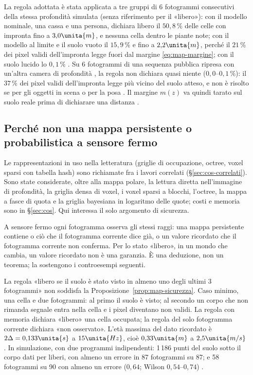 La regola adottata è stata applicata a tre gruppi di 6 fotogrammi consecutivi della stessa profondità simulata (senza riferimento per il «libero»): con il modello nominale, una cassa e una persona, dichiara libero il $50{,}8\,\%$ delle celle con impronta fino a $3{,}0\unita{m}$, e nessuna cella dentro le piante note; con il modello al limite e il suolo vuoto il $15{,}9\,\%$ e fino a $2{,}2\unita{m}$, perché il $21\,\%$ dei pixel validi dell'impronta legge fuori dal margine \eqref{eq:map-margine}; con il suolo lucido lo $0{,}1\,\%$ . Su 6 fotogrammi di una sequenza pubblica ripresa con un'altra camera di profondità \cite{tum-rgbd}, la regola non dichiara quasi niente ($0{,}0$–$0{,}1\,\%$): il $37\,\%$ dei pixel validi dell'impronta legge più vicino del suolo atteso, e non è risolto se per gli oggetti in scena o per la posa . Il margine $m(z)$ va quindi tarato sul suolo reale prima di dichiarare una distanza .

\subsection{Perché non una mappa persistente o probabilistica a sensore fermo}\label{sec:map-persistente}

Le rappresentazioni in uso nella letteratura (griglie di occupazione, octree, voxel sparsi con tabella hash) sono richiamate fra i lavori correlati (\S\ref{sec:cos-correlati}). Sono state considerate, oltre alla mappa polare, la lettura diretta nell'immagine di profondità, la griglia densa di voxel, i voxel sparsi a blocchi, l'octree, la mappa a fasce di quota e la griglia bayesiana in logaritmo delle quote; costi e memoria sono in \S\ref{sec:cos}. Qui interessa il solo argomento di sicurezza.

\begin{osservazione}\label{oss:map-fermo}
A sensore fermo ogni fotogramma osserva gli stessi raggi: una mappa persistente contiene o ciò che il fotogramma corrente dice già, o un valore ricordato che il fotogramma corrente non conferma. Per lo stato «libero», in un mondo che cambia, un valore ricordato non è una garanzia. È una deduzione, non un teorema; la sostengono i controesempi seguenti.
\end{osservazione}

\begin{controesempio}\label{cex:map-memoria}
La regola «libero se il suolo è stato visto in almeno uno degli ultimi 3 fotogrammi» non soddisfa la Proposizione~\ref{prop:map-sicurezza}. Caso minimo, una cella e due fotogrammi: al primo il suolo è visto; al secondo un corpo che non rimanda segnale entra nella cella e i pixel diventano non validi. La regola con memoria dichiara «libero» una cella occupata; la regola del solo fotogramma corrente dichiara «non osservato». L'età massima del dato ricordato è $2\Delta=0{,}133\unita{s}$ a $15\unita{Hz}$, cioè $0{,}33\unita{m}$ a $2{,}5\unita{m/s}$ . In simulazione, con due programmi indipendenti: 1\,186 punti del suolo sotto il corpo dati per liberi, con almeno un errore in 87 fotogrammi su 87; e 58 fotogrammi su 90 con almeno un errore ($0{,}64$; Wilson $0{,}54$–$0{,}74$) .
\end{controesempio}

